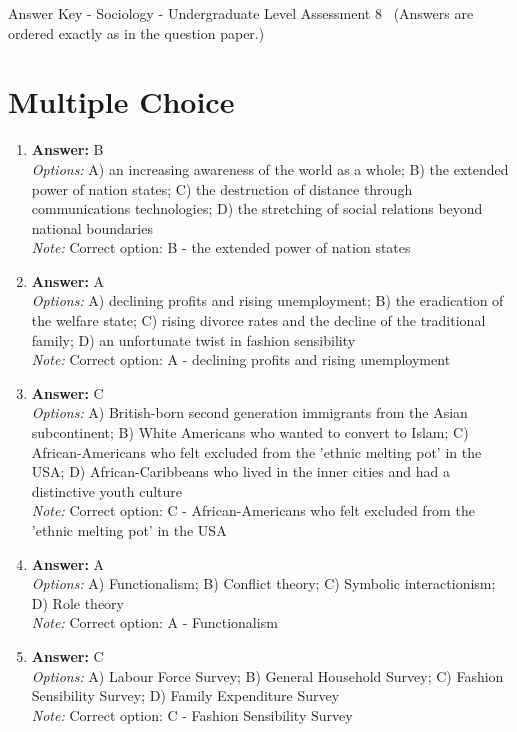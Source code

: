 \documentclass[12pt]{article}
\begin{document}
\begin{center}
Answer Key - Sociology - Undergraduate Level Assessment 8 \
\small (Answers are ordered exactly as in the question paper.)
\end{center}

\section*{Multiple Choice}
\begin{enumerate}[label=\arabic*.]
\item \textbf{Answer:} B
\\ \textit{Options:} A) an increasing awareness of the world as a whole; B) the extended power of nation states; C) the destruction of distance through communications technologies; D) the stretching of social relations beyond national boundaries
\\ \textit{Note:} Correct option: B - the extended power of nation states
\item \textbf{Answer:} A
\\ \textit{Options:} A) declining profits and rising unemployment; B) the eradication of the welfare state; C) rising divorce rates and the decline of the traditional family; D) an unfortunate twist in fashion sensibility
\\ \textit{Note:} Correct option: A - declining profits and rising unemployment
\item \textbf{Answer:} C
\\ \textit{Options:} A) British-born second generation immigrants from the Asian subcontinent; B) White Americans who wanted to convert to Islam; C) African-Americans who felt excluded from the 'ethnic melting pot' in the USA; D) African-Caribbeans who lived in the inner cities and had a distinctive youth culture
\\ \textit{Note:} Correct option: C - African-Americans who felt excluded from the 'ethnic melting pot' in the USA
\item \textbf{Answer:} A
\\ \textit{Options:} A) Functionalism; B) Conflict theory; C) Symbolic interactionism; D) Role theory
\\ \textit{Note:} Correct option: A - Functionalism
\item \textbf{Answer:} C
\\ \textit{Options:} A) Labour Force Survey; B) General Household Survey; C) Fashion Sensibility Survey; D) Family Expenditure Survey
\\ \textit{Note:} Correct option: C - Fashion Sensibility Survey
\end{enumerate}
\end{document}
